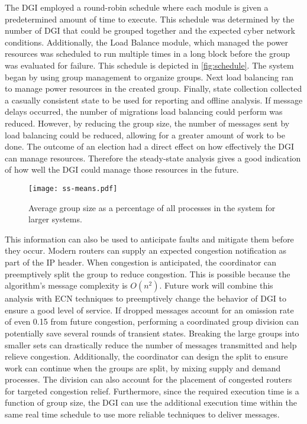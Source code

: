 The DGI employed a round-robin schedule where each module is given a predetermined amount of time to execute.
This schedule was determined by the number of DGI that could be grouped together and the expected cyber network conditions.
Additionally, the Load Balance module, which managed the power resources was scheduled to run multiple times in a long block before the group was evaluated for failure.
This schedule is depicted in \ref{fig:schedule}.
The system began by using group management to organize groups.
Next load balancing ran to manage power resources in the created group.
Finally, state collection collected a casually consistent state to be used for reporting and offline analysis.
If message delays occurred, the number of migrations load balancing could perform was reduced.
However, by reducing the group size, the number of messages sent by load balancing could be reduced, allowing for a greater amount of work to be done.
The outcome of an election had a direct effect on how effectively the DGI can manage resources.
Therefore the steady-state analysis gives a good indication of how well the DGI could manage those resources in the future.

\begin{figure}
    \centering
    \texttt{[image: ss-means.pdf]}
    \caption{Average group size as a percentage of all processes in the system for larger systems.}
    \label{fig:ss-means}
\end{figure}

This information can also be used to anticipate faults and mitigate them before they occur.
Modern routers can supply an expected congestion notification as part of the IP header\cite{ECN2}.
When congestion is anticipated, the coordinator can preemptively split the group to reduce congestion.
This is possible because the algorithm's message complexity is $O(n^2)$.
Future work will combine this analysis with \ac{ECN} techniques to preemptively change the behavior of DGI to ensure a good level of service.
If dropped messages account for an omission rate of even 0.15 from future congestion, performing a coordinated group division can potentially save several rounds of transient states.
Breaking the large groups into smaller sets can drastically reduce the number of messages transmitted and help relieve congestion.
Additionally, the coordinator can design the split to ensure work can continue when the groups are split, by mixing supply and demand processes.
The division can also account for the placement of congested routers for targeted congestion relief.
Furthermore, since the required execution time is a function of group size, the DGI can use the additional execution time within the same real time schedule to use more reliable techniques to deliver messages.


